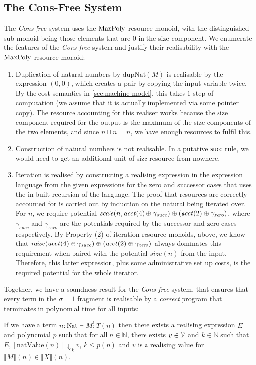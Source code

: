 \documentclass[acmsmall,review,screen,anonymous]{acmart}
\newcommand{\tyNat}{\mathrm{Nat}}
\newcommand{\conSucc}{\mathsf{succ}}
\newcommand{\dupNat}{\mathrm{dupNat}}
\begin{document}
\subsection{The Cons-Free System}
\label{sec:cons-free-sound}

The \emph{Cons-free} system uses the $\mathrm{MaxPoly}$ resource monoid, with
the distinguished sub-monoid being those elements that are $0$ in the
size component. We enumerate the features of the \emph{Cons-free}
system and justify their realisability with the $\mathrm{MaxPoly}$ resource
monoid:
\begin{enumerate}
\item Duplication of natural numbers by $\dupNat(M)$ is realisable by
  the expression $(0,0)$, which creates a pair by copying the input
  variable twice. By the cost semantics in
  \autoref{sec:machine-model}, this takes $1$ step of computation (we
  assume that it is actually implemented via some pointer copy).  The
  resource accounting for this realiser works because the size
  component required for the output is the maximum of the size
  components of the two elements, and since $n \sqcup n = n$, we have
  enough resources to fulfil this.
\item Construction of natural numbers is not realisable. In a putative
  $\conSucc$ rule, we would need to get an additional unit of size
  resource from nowhere.
\item Iteration is realised by constructing a realising expression in
  the expression language from the given expressions for the zero and
  successor cases that uses the in-built recursion of the
  language. The proof that resources are correctly accounted for is
  carried out by induction on the natural being iterated over. For
  $n$, we require potential
  $\mathit{scale}(n,\mathit{acct}(4) \oplus \gamma_{\mathit{succ}})
  \oplus (\mathit{acct}(2) \oplus \gamma_{\mathit{zero}})$, where
  $\gamma_{\mathit{succ}}$ and $\gamma_{\mathit{zero}}$ are the
  potentials required by the successor and zero cases respectively. By
  Property (2) of iteration resource monoids, above, we know that
  $\mathit{raise}(\mathit{acct}(4) \oplus \gamma_{\mathit{succ}})
  \oplus (\mathit{acct}(2) \oplus \gamma_{\mathit{zero}})$ always
  dominates this requirement when paired with the potential
  $\mathit{size}(n)$ from the input. Therefore, this latter
  expression, plus some administrative set up costs, is the required
  potential for the whole iterator.
\end{enumerate}
Together, we have a soundness result for the \emph{Cons-free} system,
that ensures that every term in the $\sigma = 1$ fragment is
realisable by a \emph{correct} program that terminates in polynomial
time for all inputs:
\begin{theorem}
  \label{thm:cons-free-soundness}
  If we have a term $n : \tyNat \vdash M \stackrel1: T(n)$ then there
  exists a realising expression $E$ and polynomial $p$ such that for
  all $n \in \mathbb{N}$, there exists $v \in \mathcal{V}$ and
  $k \in \mathbb{N}$ such that
  $E, [\mathrm{natValue}(n)] \Downarrow_k v$, $k \leq p(n)$ and $v$ is
  a realising value for
  $\llbracket M \rrbracket(n) \in \llbracket X \rrbracket(n)$.
\end{theorem}
\end{document}
